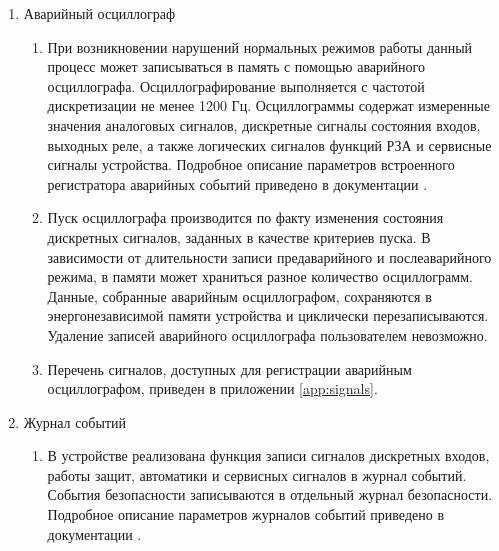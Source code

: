 \begin{enumerate}[label=\arabic{section}.\arabic{subsection}.\arabic*, labelsep=4pt, leftmargin=0pt, itemindent=57pt]
\item Аварийный осциллограф
\begin{enumerate}[label=\arabic{section}.\arabic{subsection}.\arabic{enumi}.\arabic*, labelsep=4pt, leftmargin=0em, itemindent=65pt, parsep=0pt]
\item
При возникновении нарушений нормальных режимов работы данный процесс может записываться в память с помощью аварийного осциллографа.
Осциллографирование выполняется с частотой дискретизации не менее 1200 Гц.
Осциллограммы содержат измеренные значения аналоговых сигналов, дискретные сигналы состояния входов, выходных реле, а также логических сигналов функций РЗА и сервисные сигналы устройства.
Подробное описание параметров встроенного регистратора аварийных событий приведено в документации \ManualUnitGeneral.

\item
Пуск осциллографа производится по факту изменения состояния дискретных сигналов, заданных в качестве критериев пуска.
В зависимости от длительности записи предаварийного и послеаварийного режима, в памяти может храниться разное количество осциллограмм.
Данные, собранные аварийным осциллографом, сохраняются в энергонезависимой памяти устройства и циклически перезаписываются.
Удаление записей аварийного осциллографа пользователем невозможно.

\item
Перечень сигналов, доступных для регистрации аварийным осциллографом, приведен в приложении \ref{app:signals}.

\end{enumerate}

\item Журнал событий
\begin{enumerate}[label=\arabic{section}.\arabic{subsection}.\arabic{enumi}.\arabic*, labelsep=4pt, leftmargin=0em, itemindent=65pt, parsep=0pt]

\item
В устройстве реализована функция записи сигналов дискретных входов, работы защит, автоматики и сервисных сигналов в журнал событий.
События безопасности записываются в отдельный журнал безопасности.
Подробное описание параметров журналов событий приведено в документации \ManualUnitGeneral.


\end{enumerate}
\end{enumerate}
